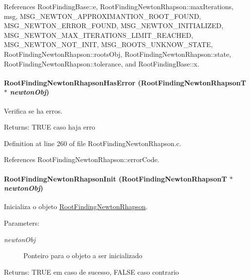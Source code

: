 References RootFindingBase::e, RootFindingNewtonRhapson::maxIterations, msg, MSG\_\-NEWTON\_\-APPROXIMANTION\_\-ROOT\_\-FOUND, MSG\_\-NEWTON\_\-ERROR\_\-FOUND, MSG\_\-NEWTON\_\-INITIALIZED, MSG\_\-NEWTON\_\-MAX\_\-ITERATIONS\_\-LIMIT\_\-REACHED, MSG\_\-NEWTON\_\-NOT\_\-INIT, MSG\_\-ROOTS\_\-UNKNOW\_\-STATE, RootFindingNewtonRhapson::rootsObj, RootFindingNewtonRhapson::state, RootFindingNewtonRhapson::tolerance, and RootFindingBase::x.\hypertarget{group____newton_g6d26d28c2bf14b9bf4072c6ccd70269f}{
\paragraph[RootFindingNewtonRhapsonHasError]{ RootFindingNewtonRhapsonHasError ({\bf RootFindingNewtonRhapsonT} $\ast$ {\em newtonObj})}\hfill}
\label{group____newton_g6d26d28c2bf14b9bf4072c6ccd70269f}


Verifica se ha erros. 

\begin{Desc}
\item[Returns:]TRUE caso haja erro \end{Desc}


Definition at line 260 of file RootFindingNewtonRhapson.c.

References RootFindingNewtonRhapson::errorCode.\hypertarget{group____newton_g3e1d44e30555a4b12ac1a0c56a75ba5e}{
\paragraph[RootFindingNewtonRhapsonInit]{ RootFindingNewtonRhapsonInit ({\bf RootFindingNewtonRhapsonT} $\ast$ {\em newtonObj})}\hfill}
\label{group____newton_g3e1d44e30555a4b12ac1a0c56a75ba5e}


Inicializa o objeto \hyperlink{structRootFindingNewtonRhapson}{RootFindingNewtonRhapson}. 

\begin{Desc}
\item[Parameters:]
\begin{description}
\item[{\em newtonObj}]Ponteiro para o objeto a ser inicializado \end{description}
\end{Desc}
\begin{Desc}
\item[Returns:]TRUE em caso de sucesso, FALSE caso contrario \end{Desc}



